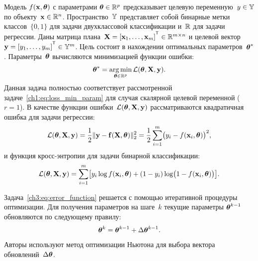 Модель $f( \mathbf{x}, \boldsymbol{\theta})$ с параметрами $\boldsymbol{\theta} \in \mathbb{R}^p$ предсказывает целевую переменную~$y \in \mathbb{Y}$ по объекту~$\mathbf{x} \in \mathbb{R}^{n}$. Пространство~$\mathbb{Y}$ представляет собой бинарные метки классов~$\{0, 1\}$ для задачи двухклассовой классификации и~$\mathbb{R}$ для задачи регрессии.
Даны матрица плана~$\bX = [\bx_1, \dots, \bx_m]^{\T} \in \bbR^{m \times n}$ и целевой вектор~$\by = [y_1, \dots, y_m]^{\T} \in \bbY^{m}$. 
Цель состоит в нахождении оптимальных параметров~$\boldsymbol{\theta}^*$.
Параметры~$\boldsymbol{\theta}$ вычисляются минимизацией функции ошибки:
\begin{equation}
\boldsymbol{\theta}^* = \mathop{\arg \min}\limits_{\boldsymbol{\theta} \in \mathbb{R}^p} \mathcal{L}(\boldsymbol{\theta}, \mathbf{X}, \mathbf{y}).
\label{ch3:eq:error_function}
\end{equation}
Данная задача полностью соответствует рассмотренной задаче~\eqref{ch1:eq:loss_min_param} для случая скалярной целевой переменной ($r=1$).
В качестве функции ошибки~$\mathcal{L} (\boldsymbol{\theta}, \mathbf{X}, \mathbf{y})$ рассматриваются квадратичная ошибка для задачи регрессии:
\begin{equation}
\mathcal{L}(\boldsymbol{\theta}, \mathbf{X}, \mathbf{y}) = \frac 12 \| \mathbf{y} - \mathbf{f}(\mathbf{X}, \boldsymbol{\theta}) \|_2^2 = \frac 12 \sum_{i=1}^m \bigl( y_i - f(\mathbf{x}_i,  \boldsymbol{\theta})\bigr)^2,
\label{ch3:eq:squared_error}
\end{equation}
и функция кросс-энтропии для задачи бинарной классификации: 
\begin{equation}
\mathcal{L}(\boldsymbol{\theta}, \mathbf{X}, \mathbf{y}) = \sum_{i=1}^m \bigl[y_i \log f (\mathbf{x}_i , \boldsymbol{\theta}) + (1-y_i) \log \bigl(1 - f (\mathbf{x}_i , \boldsymbol{\theta})\bigr)\bigr].
\label{ch3:eq:log_loss}
\end{equation}

Задача~\eqref{ch3:eq:error_function} решается с помощью итеративной процедуры оптимизации. 
Для получения параметров на шаге~$k$ текущие параметры $\boldsymbol{\theta}^{k-1}$ обновляются по следующему правилу:
\begin{equation}
\boldsymbol{\theta}^k = \boldsymbol{\theta}^{k - 1} + \Delta \boldsymbol{\theta}^{k - 1}.
\label{ch3:eq:update_rule}
\end{equation}
Авторы используют метод оптимизации Ньютона для выбора вектора обновлений~$\Delta \boldsymbol{\theta}$.

